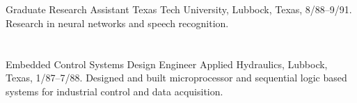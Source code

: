  \section{}
  {Graduate Research Assistant}
   {Texas Tech University, Lubbock, Texas,  8/88--9/91. Research
  in neural networks and speech recognition.}

   
\section{}{Embedded Control Systems Design Engineer} {Applied
  Hydraulics, Lubbock, Texas, 1/87--7/88.  Designed and built
  microprocessor and sequential logic based systems for industrial control
  and data acquisition. }

